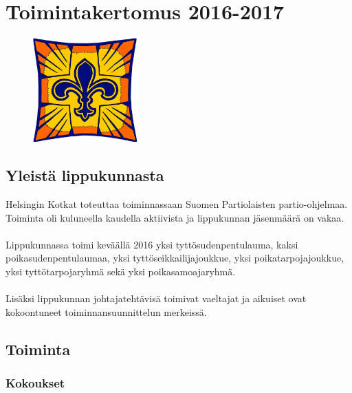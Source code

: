 \documentclass[a4paper, 12pt, finnish]{report} %
\begin{document}
\chapter{Toimintakertomus 2016-2017}

\begin{figure}[htb]
	\begin{center}
		\includegraphics[height=4cm]{heko.png}
	\end{center}
\end{figure}


\section{Yleistä lippukunnasta}
Helsingin Kotkat toteuttaa toiminnassaan Suomen Partiolaisten partio-ohjelmaa. Toiminta oli kuluneella kaudella aktiivista ja lippukunnan jäsenmäärä on vakaa.\\
\\Lippukunnassa toimi keväällä 2016 yksi tyttösudenpentulauma, kaksi poikasudenpentulaumaa, yksi tyttöseikkailijajoukkue, yksi poikatarpojajoukkue, yksi tyttötarpojaryhmä sekä yksi poikasamoajaryhmä.\\
\\Lisäksi lippukunnan johtajatehtävisä toimivat vaeltajat ja aikuiset ovat kokoontuneet toiminnansuunnittelun merkeissä.
\newpage
\section{Toiminta}
\subsection{Kokoukset}
\end{document}
